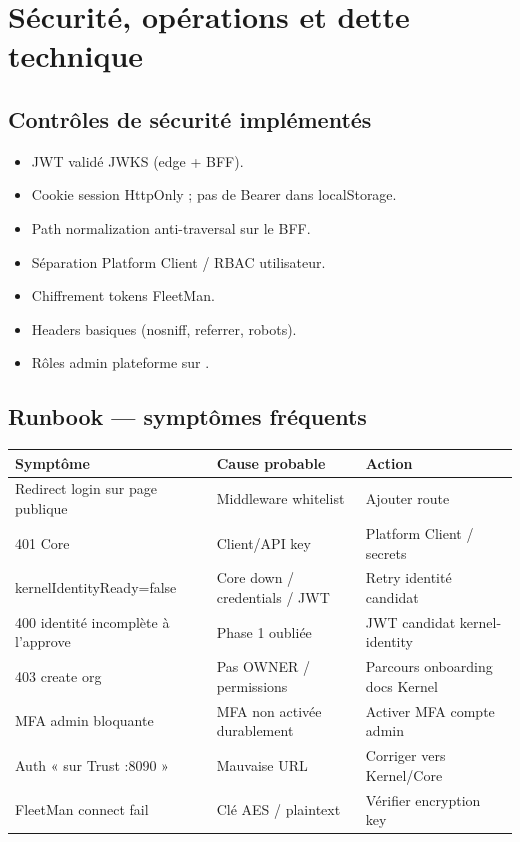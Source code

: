 \chapter{Sécurité, opérations et dette technique}

\section{Contrôles de sécurité implémentés}

\begin{itemize}
  \item JWT validé JWKS (edge + BFF).
  \item Cookie session HttpOnly ; pas de Bearer dans localStorage.
  \item Path normalization anti-traversal sur le BFF.
  \item Séparation Platform Client / RBAC utilisateur.
  \item Chiffrement tokens FleetMan.
  \item Headers basiques (nosniff, referrer, robots).
  \item Rôles admin plateforme sur .
\end{itemize}

\section{Runbook --- symptômes fréquents}

\begin{longtable}{@{}p{}p{}p{}@{}}
\toprule
\textbf{Symptôme} & \textbf{Cause probable} & \textbf{Action} \\
\midrule
\endhead
Redirect login sur page publique & Middleware whitelist & Ajouter route \\
401 Core & Client/API key & Platform Client / secrets \\
kernelIdentityReady=false & Core down / credentials / JWT & Retry identité candidat \\
400 identité incomplète à l'approve & Phase 1 oubliée & JWT candidat kernel-identity \\
403 create org & Pas OWNER / permissions & Parcours onboarding docs Kernel \\
MFA admin bloquante & MFA non activée durablement & Activer MFA compte admin \\
Auth « sur Trust :8090 » & Mauvaise URL & Corriger vers Kernel/Core \\
FleetMan connect fail & Clé AES / plaintext & Vérifier encryption key \\
\bottomrule
\end{longtable}

